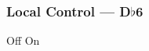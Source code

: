 \subsubsection{Local Control --- \UiKey{\SET}D$\flat$6}









































Off
On

